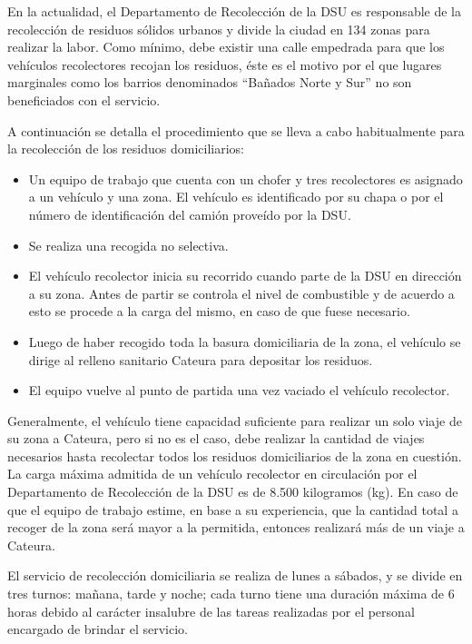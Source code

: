 \documentclass[spanish, conference]{IEEEtran}
\begin{document}
En la actualidad, el Departamento de Recolección de la DSU es responsable de la recolección de residuos sólidos urbanos y divide la ciudad en 134 zonas para realizar la labor. Como mínimo, debe existir una calle empedrada para que los vehículos recolectores recojan los residuos, éste es el motivo por el que lugares marginales como los barrios denominados ``Bañados Norte y Sur'' no son beneficiados con el servicio.

A continuación se detalla el procedimiento que se lleva a cabo habitualmente para la recolección de los residuos domiciliarios:

\begin{itemize}
\item Un equipo de trabajo que cuenta con un chofer y tres recolectores es asignado a un vehículo y una zona. El vehículo es identificado por su chapa o por el número de identificación del camión proveído por la DSU.
\item Se realiza una recogida no selectiva.
\item El vehículo recolector inicia su recorrido cuando parte de la DSU en dirección a su zona. Antes de partir se controla el nivel de combustible y de acuerdo a esto se procede a la carga del mismo, en caso de que fuese necesario.
\item Luego de haber recogido toda la basura domiciliaria de la zona, el vehículo se dirige al relleno sanitario Cateura para depositar los residuos.
\item El equipo vuelve al punto de partida una vez vaciado el vehículo recolector.  
\end{itemize}

Generalmente, el vehículo tiene capacidad suficiente para realizar un solo viaje de su zona a Cateura, pero si no es el caso, debe realizar la cantidad de viajes necesarios hasta recolectar todos los residuos domiciliarios de la zona en cuestión. La carga máxima admitida de un vehículo recolector en circulación por el Departamento de Recolección de la DSU es de 8.500 kilogramos (kg). En caso de que el equipo de trabajo estime, en base a su experiencia, que la cantidad total a recoger de la zona será mayor a la permitida, entonces realizará más de un viaje a Cateura.

El servicio de recolección domiciliaria se realiza de lunes a sábados, y se divide en tres turnos: mañana, tarde y noche; cada turno tiene una duración máxima de 6 horas debido al carácter insalubre de las tareas realizadas por el personal encargado de brindar el servicio.
\end{document}
